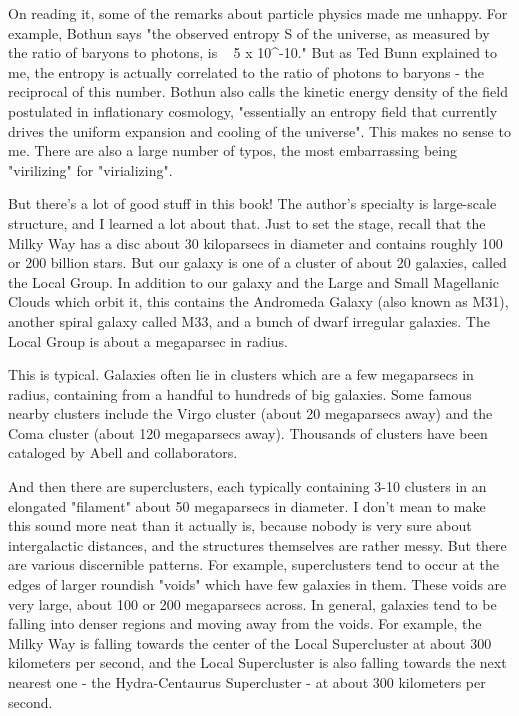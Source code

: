 On reading it, some of the remarks about particle physics made me
unhappy.  For example, Bothun says "the observed entropy S of the
universe, as measured by the ratio of baryons to photons, is ~ 5 x
10^{-10}." But as Ted Bunn explained to me, the entropy is
actually correlated to the ratio of photons to baryons - the reciprocal
of this number.  Bothun also calls the kinetic energy density of the
field postulated in inflationary cosmology, "essentially an entropy
field that currently drives the uniform expansion and cooling of the
universe".  This makes no sense to me.  There are also a large
number of typos, the most embarrassing being "virilizing" for
"virializing".

But there's a lot of good stuff in this book!  The author's specialty is
large-scale structure, and I learned a lot about that.  Just to set the
stage, recall that the Milky Way has a disc about 30 kiloparsecs in
diameter and contains roughly 100 or 200 billion stars.  But our galaxy
is one of a cluster of about 20 galaxies, called the Local Group.  In
addition to our galaxy and the Large and Small Magellanic Clouds which
orbit it, this contains the Andromeda Galaxy (also known as M31),
another spiral galaxy called M33, and a bunch of dwarf irregular
galaxies.  The Local Group is about a megaparsec in radius.

This is typical.  Galaxies often lie in clusters which are a few
megaparsecs in radius, containing from a handful to hundreds of big
galaxies.  Some famous nearby clusters include the Virgo cluster (about
20 megaparsecs away) and the Coma cluster (about 120 megaparsecs away).
Thousands of clusters have been cataloged by Abell and collaborators.

And then there are superclusters, each typically containing 3-10
clusters in an elongated "filament" about 50 megaparsecs in
diameter.  I don't mean to make this sound more neat than it actually
is, because nobody is very sure about intergalactic distances, and the
structures themselves are rather messy.  But there are various discernible
patterns.  For example, superclusters tend to occur at the edges of
larger roundish "voids" which have few galaxies in them.
These voids are very large, about 100 or 200 megaparsecs across.  In
general, galaxies tend to be falling into denser regions and moving away
from the voids.  For example, the Milky Way is falling towards the
center of the Local Supercluster at about 300 kilometers per second, and
the Local Supercluster is also falling towards the next nearest one -
the Hydra-Centaurus Supercluster - at about 300 kilometers per second.

